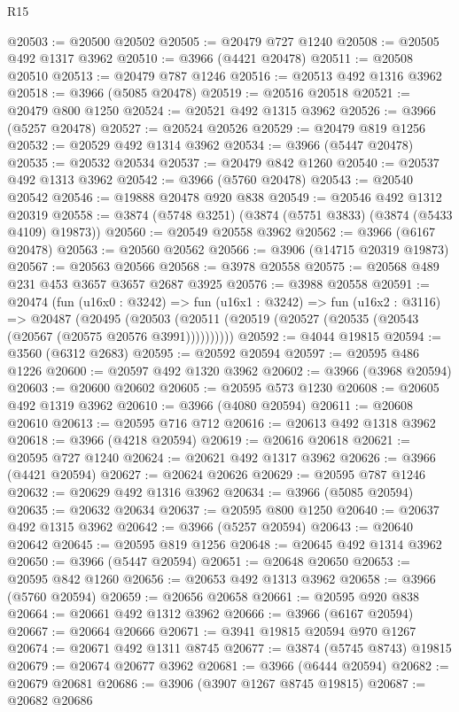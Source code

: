 \begin{lexlean}{R15}
\begin{coremodule}
@20503 := @20500 @20502
@20505 := @20479 @727 @1240
@20508 := @20505 @492 @1317 @3962
@20510 := @3966 (@4421 @20478)
@20511 := @20508 @20510
@20513 := @20479 @787 @1246
@20516 := @20513 @492 @1316 @3962
@20518 := @3966 (@5085 @20478)
@20519 := @20516 @20518
@20521 := @20479 @800 @1250
@20524 := @20521 @492 @1315 @3962
@20526 := @3966 (@5257 @20478)
@20527 := @20524 @20526
@20529 := @20479 @819 @1256
@20532 := @20529 @492 @1314 @3962
@20534 := @3966 (@5447 @20478)
@20535 := @20532 @20534
@20537 := @20479 @842 @1260
@20540 := @20537 @492 @1313 @3962
@20542 := @3966 (@5760 @20478)
@20543 := @20540 @20542
@20546 := @19888 @20478 @920 @838
@20549 := @20546 @492 @1312 @20319
@20558 := @3874 (@5748 @3251) (@3874 (@5751 @3833) (@3874 (@5433 @4109) @19873))
@20560 := @20549 @20558 @3962
@20562 := @3966 (@6167 @20478)
@20563 := @20560 @20562
@20566 := @3906 (@14715 @20319 @19873)
@20567 := @20563 @20566
@20568 := @3978 @20558
@20575 := @20568 @489 @231 @453 @3657 @3657 @2687 @3925
@20576 := @3988 @20558
@20591 := @20474
    (fun (u16x0 : @3242) =>
    fun (u16x1 : @3242) =>
    fun (u16x2 : @3116) =>
    @20487
      (@20495 (@20503 (@20511 (@20519 (@20527 (@20535 (@20543 (@20567 (@20575 @20576 @3991))))))))))
@20592 := @4044 @19815
@20594 := @3560 (@6312 @2683)
@20595 := @20592 @20594
@20597 := @20595 @486 @1226
@20600 := @20597 @492 @1320 @3962
@20602 := @3966 (@3968 @20594)
@20603 := @20600 @20602
@20605 := @20595 @573 @1230
@20608 := @20605 @492 @1319 @3962
@20610 := @3966 (@4080 @20594)
@20611 := @20608 @20610
@20613 := @20595 @716 @712
@20616 := @20613 @492 @1318 @3962
@20618 := @3966 (@4218 @20594)
@20619 := @20616 @20618
@20621 := @20595 @727 @1240
@20624 := @20621 @492 @1317 @3962
@20626 := @3966 (@4421 @20594)
@20627 := @20624 @20626
@20629 := @20595 @787 @1246
@20632 := @20629 @492 @1316 @3962
@20634 := @3966 (@5085 @20594)
@20635 := @20632 @20634
@20637 := @20595 @800 @1250
@20640 := @20637 @492 @1315 @3962
@20642 := @3966 (@5257 @20594)
@20643 := @20640 @20642
@20645 := @20595 @819 @1256
@20648 := @20645 @492 @1314 @3962
@20650 := @3966 (@5447 @20594)
@20651 := @20648 @20650
@20653 := @20595 @842 @1260
@20656 := @20653 @492 @1313 @3962
@20658 := @3966 (@5760 @20594)
@20659 := @20656 @20658
@20661 := @20595 @920 @838
@20664 := @20661 @492 @1312 @3962
@20666 := @3966 (@6167 @20594)
@20667 := @20664 @20666
@20671 := @3941 @19815 @20594 @970 @1267
@20674 := @20671 @492 @1311 @8745
@20677 := @3874 (@5745 @8743) @19815
@20679 := @20674 @20677 @3962
@20681 := @3966 (@6444 @20594)
@20682 := @20679 @20681
@20686 := @3906 (@3907 @1267 @8745 @19815)
@20687 := @20682 @20686

\end{coremodule}
\end{lexlean}
